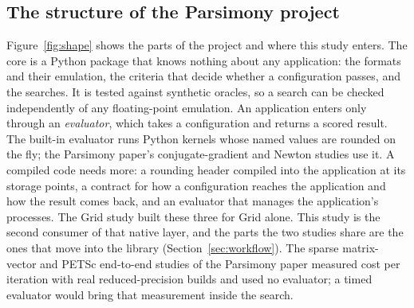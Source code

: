 \documentclass[11pt]{article}
\begin{document}
\subsection{The structure of the Parsimony project}
\label{sec:shape}
Figure~\ref{fig:shape} shows the parts of the project and where this study enters.  The core
is a Python package that knows nothing about any application: the formats and their emulation,
the criteria that decide whether a configuration passes, and the searches.  It is tested against
synthetic oracles, so a search can be checked independently of any floating-point emulation.
An application enters only through an \emph{evaluator}, which takes a configuration and returns
a scored result.  The built-in evaluator runs Python kernels whose named values are rounded on
the fly; the Parsimony paper's conjugate-gradient and Newton studies use it.  A compiled code
needs more: a rounding header compiled into the application at its storage points, a
contract for how a configuration reaches the application and how the result comes back, and an
evaluator that manages the application's processes.  The Grid study built these three for Grid
alone.  This study is the second consumer of that native layer, and the parts the two studies
share are the ones that move into the library (Section~\ref{sec:workflow}).  The sparse
matrix-vector and PETSc end-to-end studies of the Parsimony paper measured cost per iteration
with real reduced-precision builds and used no evaluator; a timed evaluator would bring that
measurement inside the search.
\end{document}
